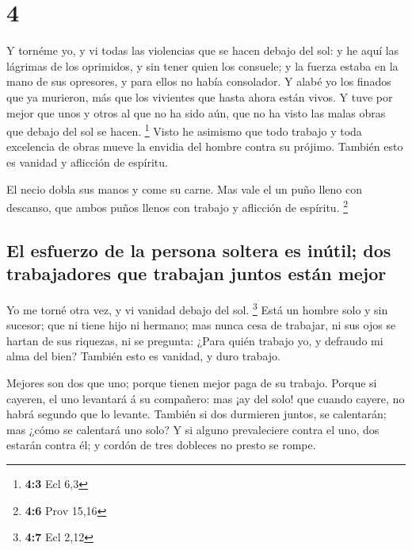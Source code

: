 \hypertarget{section-3}{%
\section{4}\label{section-3}}

 Y tornéme yo, y vi todas las violencias que se hacen debajo
del sol: y he aquí las lágrimas de los oprimidos, y sin tener quien los
consuele; y la fuerza estaba en la mano de sus opresores, y para ellos
no había consolador.  Y alabé yo los finados que ya
murieron, más que los vivientes que hasta ahora están vivos.
 Y tuve por mejor que unos y otros al que no ha sido aún,
que no ha visto las malas obras que debajo del sol se hacen. \footnote{\textbf{4:3}
  Ecl 6,3}  Visto he asimismo que todo trabajo y toda
excelencia de obras mueve la envidia del hombre contra su prójimo.
También esto es vanidad y aflicción de espíritu.

 El necio dobla sus manos y come su carne.  Mas
vale el un puño lleno con descanso, que ambos puños llenos con trabajo y
aflicción de espíritu. \footnote{\textbf{4:6} Prov 15,16}

\hypertarget{el-esfuerzo-de-la-persona-soltera-es-inuxfatil-dos-trabajadores-que-trabajan-juntos-estuxe1n-mejor}{%
\subsection{El esfuerzo de la persona soltera es inútil; dos
trabajadores que trabajan juntos están
mejor}\label{el-esfuerzo-de-la-persona-soltera-es-inuxfatil-dos-trabajadores-que-trabajan-juntos-estuxe1n-mejor}}

 Yo me torné otra vez, y vi vanidad debajo del sol.
\footnote{\textbf{4:7} Ecl 2,12}  Está un hombre solo y sin
sucesor; que ni tiene hijo ni hermano; mas nunca cesa de trabajar, ni
sus ojos se hartan de sus riquezas, ni se pregunta: ¿Para quién trabajo
yo, y defraudo mi alma del bien? También esto es vanidad, y duro
trabajo.

 Mejores son dos que uno; porque tienen mejor paga de su
trabajo.  Porque si cayeren, el uno levantará á su
compañero: mas ¡ay del solo! que cuando cayere, no habrá segundo que lo
levante.  También si dos durmieren juntos, se calentarán;
mas ¿cómo se calentará uno solo?  Y si alguno prevaleciere
contra el uno, dos estarán contra él; y cordón de tres dobleces no
presto se rompe.


